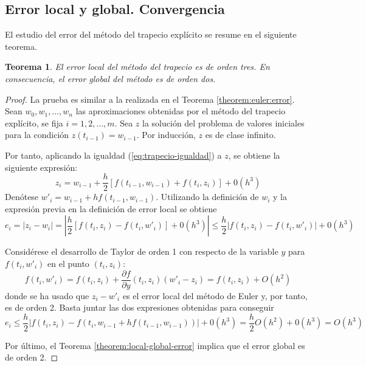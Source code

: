 \documentclass{article}
\theoremstyle{theorem-style}  %
\newtheorem{theorem}{Teorema}[section]  %
\theoremstyle{definition-style}
\theoremstyle{example-style}
\begin{document}
	\subsection{Error local y global. Convergencia} \label{sec:trapecio-explicito:error}

		El estudio del error del método del trapecio explícito se resume en el siguiente teorema.

		\begin{theorem}
			El error local del método del trapecio es de orden tres. En consecuencia, el error global del método es de orden dos.
		\end{theorem}

		\begin{proof}
			La prueba es similar a la realizada en el Teorema \ref{theorem:euler:error}. Sean $w_0, w_1, \ldots, w_n$ las aproximaciones obtenidas por el método del trapecio explícito, se fija $i = 1, 2, \ldots, m$. Sea $z$ la solución del problema de valores iniciales para la condición $z(t_{i-1}) = w_{i-1}$. Por inducción, $z$ es de clase infinito.

			Por tanto, aplicando la igualdad (\ref{eq:trapecio-igualdad}) a $z$, se obtiene la siguiente expresión:
			$$ z_i = w_{i-1} + \frac{h}{2} \left[f(t_{i-1},w_{i-1}) + f(t_i, z_i)\right] + 0(h^3) $$
			Denótese $w'_i =  w_{i-1} + hf(t_{i-1}, w_{i-1})$. Utilizando la definición de $w_i$ y la expresión previa en la definición de error local se obtiene
			$$ e_i = \left|z_i - w_i\right| =  \left|\frac{h}{2} \left[f(t_i, z_i) - f(t_i, w'_i)\right] + 0(h^3) \right| \le \frac{h}{2} \left|f(t_i, z_i) - f(t_i, w'_i)\right| + 0(h^3) $$

			Considérese el desarrollo de Taylor de orden 1 con respecto de la variable $y$ para $f(t_i, w'_i)$ en el punto $(t_i,z_i)$:
			$$ f(t_i, w'_i) = f(t_i, z_i) + \frac{\partial f}{\partial y}(t_i, z_i) (w'_i - z_i) = f(t_i, z_i) + O(h^2) $$
			donde se ha usado que $z_i - w'_i$ es el error local del método de Euler y, por tanto, es de orden 2. Basta juntar las dos expresiones obtenidas para conseguir
			$$ e_i \le \frac{h}{2} \left|f(t_i, z_i) - f(t_i, w_{i-1} + hf(t_{i-1}, w_{i-1}))\right| + 0(h^3) =  \frac{h}{2} O(h^2) + 0(h^3) = O(h^3) $$

			Por último, el Teorema \ref{theorem:local-global-error} implica que el error global es de orden 2.

		\end{proof}
\end{document}
